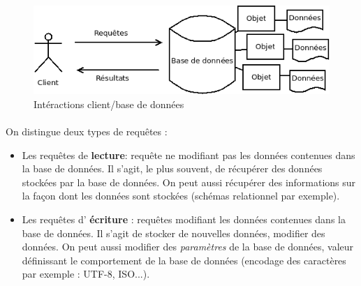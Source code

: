 \documentclass[12pt]{article}
\begin{document}
\begin{figure}[h]
	\centering
		\includegraphics[width=12cm]{bd.png}
	\caption{Intéractions client/base de données \label{fig:bd}}
\end{figure}


\paragraph{} On distingue deux types de requêtes :
\begin{itemize}
 \item Les requêtes de \textbf{lecture}: requête ne modifiant pas les données contenues dans la base de données. \newline
 Il s'agit, le plus souvent, de récupérer des données stockées par la base de données.
 On peut aussi récupérer des informations sur la façon dont les données sont stockées (schémas relationnel par exemple).
 
 \item Les requêtes d' \textbf{écriture} : requêtes modifiant les données contenues dans la base de données. \newline
 Il s'agit de stocker de nouvelles données, modifier des données. 
 On peut aussi modifier des \textit{paramètres} de la base de données, valeur définissant le comportement de la base de données (encodage des caractères par exemple : UTF-8, ISO...).
\end{itemize}



\end{document}
